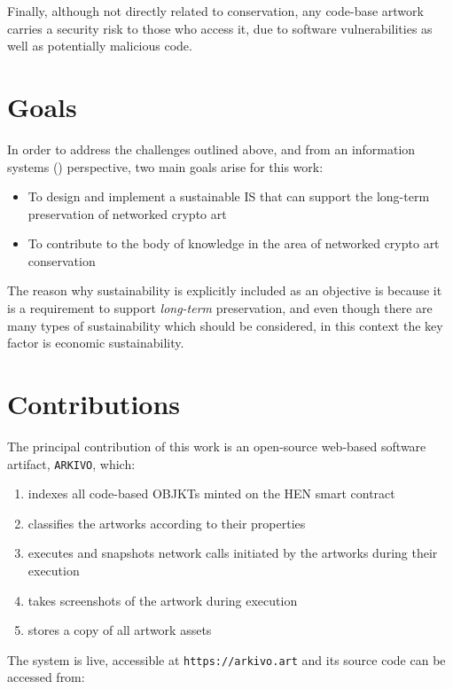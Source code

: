 Finally, although not directly related to conservation, any code-base artwork carries a security risk to those who access it, due to software vulnerabilities as well as potentially malicious code.

\section{Goals}

In order to address the challenges outlined above, and from an information systems () perspective, two main goals arise for this work:

\begin{itemize}
	\item To design and implement a sustainable IS that can support the long-term preservation of networked crypto art
	\item To contribute to the body of knowledge in the area of networked crypto art conservation
\end{itemize}

The reason why sustainability is explicitly included as an objective is because it is a requirement to support \emph{long-term} preservation, and even though there are many types of sustainability which should be considered, in this context the key factor is economic sustainability.

\section{Contributions}

The principal contribution of this work is an open-source web-based software artifact, \texttt{ARKIVO}, which:

\begin{enumerate}
	\item indexes all code-based OBJKTs minted on the HEN smart contract
	\item classifies the artworks according to their properties
	\item executes and snapshots network calls initiated by the artworks during their execution
	\item takes screenshots of the artwork during execution
	\item stores a copy of all artwork assets
\end{enumerate}

\vspace{0.5cm}

The system is live, accessible at \texttt{https://arkivo.art} and its source code can be accessed from:

